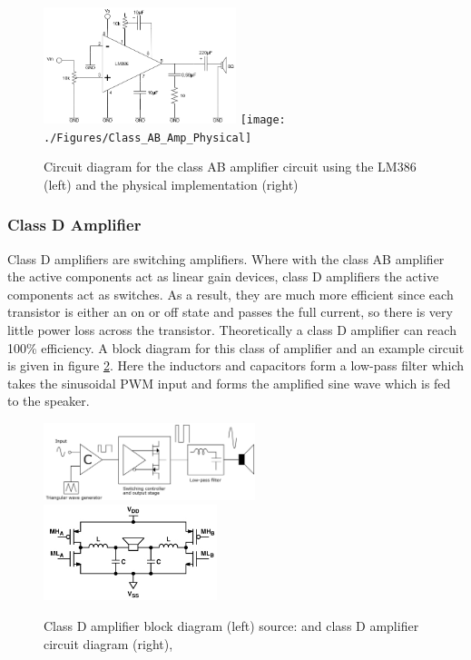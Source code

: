 \documentclass[12pt, a4paper]{article}
\begin{document}
\begin{figure}[!htb]
	\includegraphics[width=0.5\textwidth]{./Figures/Class_AB_Amp}
	\texttt{[image: ./Figures/Class\_AB\_Amp\_Physical]}	
	\caption{Circuit diagram for the class AB amplifier circuit using the LM386 (left) and the physical implementation (right)}
	\label{fig:lm386Circuit}
\end{figure}

\subsubsection{Class D Amplifier}
Class D amplifiers are switching amplifiers. Where with the class AB amplifier the active components act as linear gain devices, class D amplifiers the active components act as switches. As a result, they are much more efficient since each transistor is either an on or off state and passes the full current, so there is very little power loss across the transistor. Theoretically a class D amplifier can reach 100\% efficiency. A block diagram for this class of amplifier and an example circuit is given in figure \ref{fig:classDAmplifierGeneral}. Here the inductors and capacitors form a low-pass filter which takes the sinusoidal PWM input and forms the amplified sine wave which is fed to the speaker. \\
\begin{figure}[!htb]
	\includegraphics[width=0.55\textwidth]{./Figures/class_D_amplifier}
	\includegraphics[width=0.45\textwidth]{./Figures/class_D_amplifier2}
	\caption{Class D amplifier block diagram (left) source: \cite{classDamplifier} and class D amplifier circuit diagram (right), \cite{classDamplifiercircuit}}
	\label{fig:classDAmplifierGeneral}
\end{figure}\\
\end{document}
